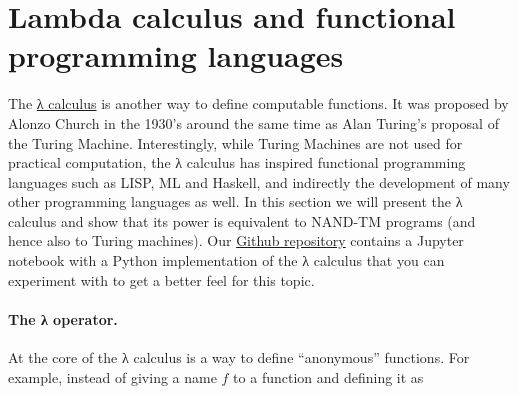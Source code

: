 \hypertarget{nandtmprogconfig}{}

\section{Lambda calculus and functional programming
languages}\label{lambdacalculussec}

The \href{https://goo.gl/B9HwT8}{λ calculus} is another way to define
computable functions. It was proposed by Alonzo Church in the 1930's
around the same time as Alan Turing's proposal of the Turing Machine.
Interestingly, while Turing Machines are not used for practical
computation, the λ calculus has inspired functional programming
languages such as LISP, ML and Haskell, and indirectly the development
of many other programming languages as well. In this section we will
present the λ calculus and show that its power is equivalent to NAND-TM
programs (and hence also to Turing machines). Our
\href{https://github.com/boazbk/tcscode}{Github repository} contains a
Jupyter notebook with a Python implementation of the λ calculus that you
can experiment with to get a better feel for this topic.

\paragraph{The λ operator.} At the core of the λ calculus is a way to
define ``anonymous'' functions. For example, instead of giving a name
\(f\) to a function and defining it as


